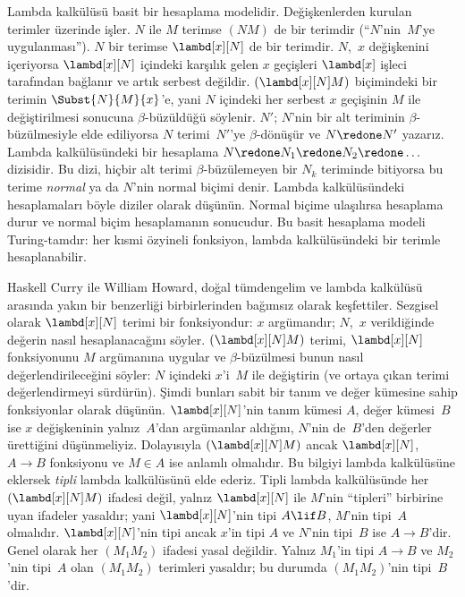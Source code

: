 \documentclass[../../../include/open-logic-section]{subfiles}
\begin{document}


Lambda kalkülüsü basit bir hesaplama modelidir. Değişkenlerden kurulan
terimler üzerinde işler. $N$ ile $M$ terimse $(NM)$ de bir terimdir
(``$N$'nin~$M$'ye uygulanması''). $N$ bir terimse $\lambd[x][N]$ de bir
terimdir. $N$,~$x$ değişkenini içeriyorsa $\lambd[x][N]$ içindeki karşılık
gelen $x$ geçişleri $\lambd[x]$ işleci tarafından bağlanır ve artık serbest
değildir. $(\lambd[x][N]M)$ biçimindeki bir terimin $\Subst{N}{M}{x}$'e,
yani $N$ içindeki her serbest $x$ geçişinin $M$ ile değiştirilmesi sonucuna
$\beta$-büzüldüğü söylenir. $N'$; $N$'nin bir alt teriminin
$\beta$-büzülmesiyle elde ediliyorsa $N$ terimi~$N'$'ye $\beta$-dönüşür ve
$N \redone N'$ yazarız. Lambda kalkülüsündeki bir hesaplama $N \redone
N_1 \redone N_2 \redone \dots$ dizisidir. Bu dizi, hiçbir alt terimi
$\beta$-büzülemeyen bir $N_k$ teriminde bitiyorsa bu terime
\emph{normal} ya da $N$'nin normal biçimi denir. Lambda kalkülüsündeki
hesaplamaları böyle diziler olarak düşünün. Normal biçime ulaşılırsa
hesaplama durur ve normal biçim hesaplamanın sonucudur. Bu basit hesaplama
modeli Turing-tamdır: her kısmi özyineli fonksiyon, lambda kalkülüsündeki
bir terimle hesaplanabilir.

Haskell Curry ile William Howard, doğal tümdengelim ve lambda kalkülüsü
arasında yakın bir benzerliği birbirlerinden bağımsız olarak keşfettiler.
Sezgisel olarak $\lambd[x][N]$ terimi bir fonksiyondur: $x$ argümandır;
$N$,~$x$ verildiğinde değerin nasıl hesaplanacağını söyler.
$(\lambd[x][N]M)$ terimi, $\lambd[x][N]$ fonksiyonunu $M$ argümanına
uygular ve $\beta$-büzülmesi bunun nasıl değerlendirileceğini söyler:
$N$ içindeki $x$'i~$M$ ile değiştirin (ve ortaya çıkan terimi
değerlendirmeyi sürdürün). Şimdi bunları sabit bir tanım ve değer kümesine
sahip fonksiyonlar olarak düşünün. $\lambd[x][N]$'nin tanım kümesi $A$,
değer kümesi~$B$ ise $x$ değişkeninin yalnız~$A$'dan argümanlar aldığını,
$N$'nin de~$B$'den değerler ürettiğini düşünmeliyiz. Dolayısıyla
$(\lambd[x][N]M)$ ancak $\lambd[x][N]$, $A \to B$ fonksiyonu ve $M \in A$
ise anlamlı olmalıdır. Bu bilgiyi lambda kalkülüsüne eklersek \emph{tipli}
lambda kalkülüsünü elde ederiz. Tipli lambda kalkülüsünde her
$(\lambd[x][N]M)$ ifadesi değil, yalnız $\lambd[x][N]$ ile $M$'nin
``tipleri'' birbirine uyan ifadeler yasaldır; yani $\lambd[x][N]$'nin tipi
$A \lif B$, $M$'nin tipi~$A$ olmalıdır. $\lambd[x][N]$'nin tipi ancak
$x$'in tipi $A$ ve $N$'nin tipi~$B$ ise $A \to B$'dir. Genel olarak her
$(M_1M_2)$ ifadesi yasal değildir. Yalnız $M_1$'in tipi $A \to B$ ve
$M_2$'nin tipi~$A$ olan $(M_1M_2)$ terimleri yasaldır; bu durumda
$(M_1M_2)$'nin tipi~$B$'dir.
\end{document}
